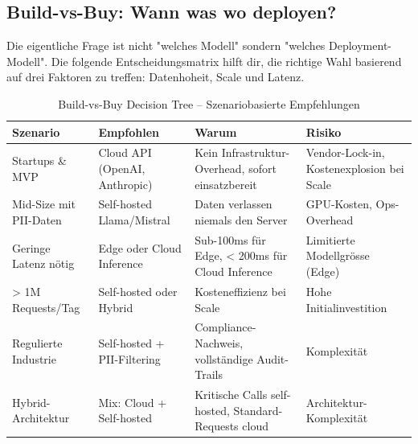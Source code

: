 \subsection{Build-vs-Buy: Wann was wo deployen?}

Die eigentliche Frage ist nicht "welches Modell" sondern "welches Deployment-Modell". Die folgende Entscheidungsmatrix hilft dir, die richtige Wahl basierend auf drei Faktoren zu treffen: Datenhoheit, Scale und Latenz.

\begin{table}[H]
\centering
\small
\begin{tabularx}{\linewidth}{l X X X}
\toprule
\textbf{Szenario} & \textbf{Empfohlen} & \textbf{Warum} & \textbf{Risiko} \\
\midrule
Startups \& MVP & Cloud API (OpenAI, Anthropic) & Kein Infrastruktur-Overhead, sofort einsatzbereit & Vendor-Lock-in, Kostenexplosion bei Scale \\
Mid-Size mit PII-Daten & Self-hosted Llama/Mistral & Daten verlassen niemals den Server & GPU-Kosten, Ops-Overhead \\
Geringe Latenz nötig & Edge oder Cloud Inference & Sub-100ms für Edge, \textless{} 200ms für Cloud Inference & Limitierte Modellgrösse (Edge) \\
\textgreater{} 1M Requests/Tag & Self-hosted oder Hybrid & Kosteneffizienz bei Scale & Hohe Initialinvestition \\
Regulierte Industrie & Self-hosted + PII-Filtering & Compliance-Nachweis, vollständige Audit-Trails & Komplexität \\
Hybrid-Architektur & Mix: Cloud + Self-hosted & Kritische Calls self-hosted, Standard-Requests cloud & Architektur-Komplexität \\
\bottomrule
\end{tabularx}
\caption{Build-vs-Buy Decision Tree -- Szenariobasierte Empfehlungen}
\end{table}



